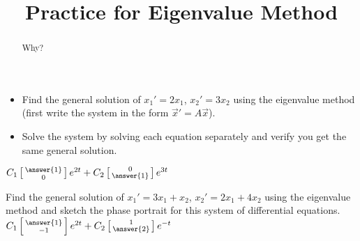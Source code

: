 \documentclass{ximera}
\title{Practice for Eigenvalue Method}
\begin{document}
\begin{abstract}
Why?
\end{abstract}
\maketitle


\begin{exercise}
    \begin{itemize}
        \item Find the general solution of $x_1' = 2 x_1$, $x_2' = 3 x_2$ using the eigenvalue method (first write the system in the form ${\vec{x}}' = A \vec{x}$).
        \item Solve the system by solving each equation separately and verify you get the same general solution.
    \end{itemize}
    $C_1\left[\begin{smallmatrix} \answer{1} \\ 0 \end{smallmatrix}\right]e^{2t} + C_2\left[\begin{smallmatrix} 0 \\ \answer{1}  \end{smallmatrix}\right]e^{3t}$
\end{exercise}

\begin{exercise}
    Find the general solution of $x_1' = 3 x_1 + x_2$, $x_2' = 2 x_1 + 4 x_2$ using the eigenvalue method and sketch the phase portrait for this system of differential equations.\\
    $C_1 \left[\begin{smallmatrix} \answer{1} \\ -1 \end{smallmatrix}\right]e^{2t} + C_2\left[\begin{smallmatrix} 1 \\ \answer{2} \end{smallmatrix}\right]e^{-t}$
\end{exercise}
\end{document}
